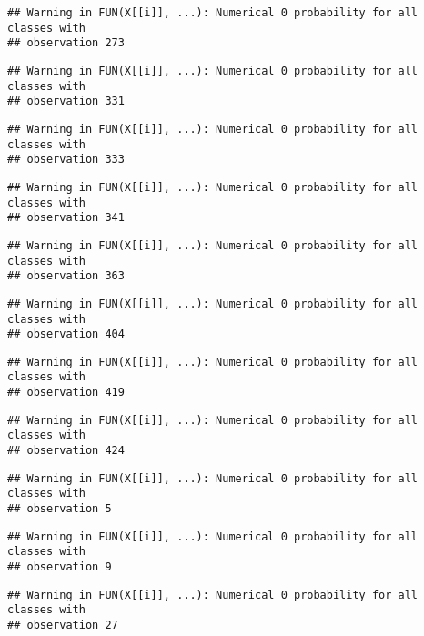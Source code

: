 \documentclass[]{article}
\begin{document}
\begin{verbatim}
## Warning in FUN(X[[i]], ...): Numerical 0 probability for all classes with
## observation 273
\end{verbatim}

\begin{verbatim}
## Warning in FUN(X[[i]], ...): Numerical 0 probability for all classes with
## observation 331
\end{verbatim}

\begin{verbatim}
## Warning in FUN(X[[i]], ...): Numerical 0 probability for all classes with
## observation 333
\end{verbatim}

\begin{verbatim}
## Warning in FUN(X[[i]], ...): Numerical 0 probability for all classes with
## observation 341
\end{verbatim}

\begin{verbatim}
## Warning in FUN(X[[i]], ...): Numerical 0 probability for all classes with
## observation 363
\end{verbatim}

\begin{verbatim}
## Warning in FUN(X[[i]], ...): Numerical 0 probability for all classes with
## observation 404
\end{verbatim}

\begin{verbatim}
## Warning in FUN(X[[i]], ...): Numerical 0 probability for all classes with
## observation 419
\end{verbatim}

\begin{verbatim}
## Warning in FUN(X[[i]], ...): Numerical 0 probability for all classes with
## observation 424
\end{verbatim}

\begin{verbatim}
## Warning in FUN(X[[i]], ...): Numerical 0 probability for all classes with
## observation 5
\end{verbatim}

\begin{verbatim}
## Warning in FUN(X[[i]], ...): Numerical 0 probability for all classes with
## observation 9
\end{verbatim}

\begin{verbatim}
## Warning in FUN(X[[i]], ...): Numerical 0 probability for all classes with
## observation 27
\end{verbatim}
\end{document}
